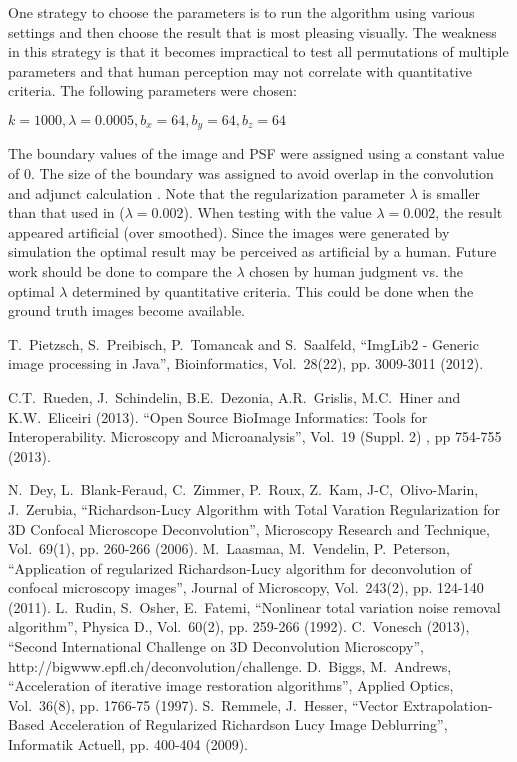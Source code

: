 \documentclass[conference,a4paper]{IEEEtran}
\begin{document}
One strategy to choose the parameters is to run the algorithm using various settings and then choose the result that is most pleasing visually.  The weakness in this strategy is that it becomes impractical to test all permutations of multiple parameters and that human perception may not correlate with quantitative criteria.  The following parameters were chosen:

$ k=1000, \lambda=0.0005, b_x=64, b_y=64, b_z=64 $

The boundary values of the image and PSF were assigned using a constant value of 0.  The size of the boundary was assigned to avoid overlap in the convolution and adjunct calculation \cite{vonesch2013}.  Note that the regularization parameter $\lambda$ is smaller than that used in \cite{dey2006} ($\lambda=0.002$).  When testing with the value $\lambda=0.002$, the result appeared artificial (over smoothed). Since the images were generated by simulation the optimal result may be perceived as artificial by a human. \newpage Future work should be done to compare the $\lambda$ chosen by human judgment vs. the optimal $\lambda$ determined by quantitative criteria. This could be done when the ground truth images become available. 

\begin{thebibliography}{}

 T.\ Pietzsch, S.\ Preibisch, P.\ Tomancak and S.\ Saalfeld, ``ImgLib2 - Generic image processing in Java'', Bioinformatics, Vol.\  28(22), pp. 3009-3011 (2012).

 C.T.\ Rueden, J.\ Schindelin, B.E.\ Dezonia, A.R.\ Grislis, M.C.\ Hiner and K.W.\ Eliceiri (2013). ``Open Source BioImage Informatics: Tools for Interoperability. Microscopy and Microanalysis'', Vol.\ 19 (Suppl. 2) , pp 754-755 (2013). 

 N.\ Dey, L.\ Blank-Feraud, C.\ Zimmer, P.\ Roux, Z.\ Kam, J-C,\ Olivo-Marin, J.\ Zerubia, ``Richardson-Lucy Algorithm with Total Varation Regularization for 3D Confocal Microscope Deconvolution'', Microscopy Research and Technique, Vol.\ 69(1), pp. 260-266 (2006).
 M.\ Laasmaa, M.\ Vendelin, P.\ Peterson, ``Application of regularized Richardson-Lucy algorithm for deconvolution of confocal microscopy images'',  Journal of Microscopy, Vol.\ 243(2), pp. 124-140 (2011).
 L.\ Rudin, S.\ Osher, E.\ Fatemi, ``Nonlinear total variation noise removal algorithm'',  Physica D., Vol.\ 60(2), pp. 259-266 (1992).
 C.\ Vonesch (2013), ``Second International Challenge on 3D Deconvolution Microscopy'', http://bigwww.epfl.ch/deconvolution/challenge.
 D.\ Biggs, M.\ Andrews, ``Acceleration of iterative
image restoration algorithms'',  Applied Optics, Vol.\ 36(8), pp.
1766-75 (1997).
 S.\ Remmele, J.\ Hesser, ``Vector
Extrapolation-Based Acceleration of Regularized Richardson Lucy Image
Deblurring'',  Informatik Actuell, pp. 400-404 (2009).

\end{thebibliography}
\end{document}

